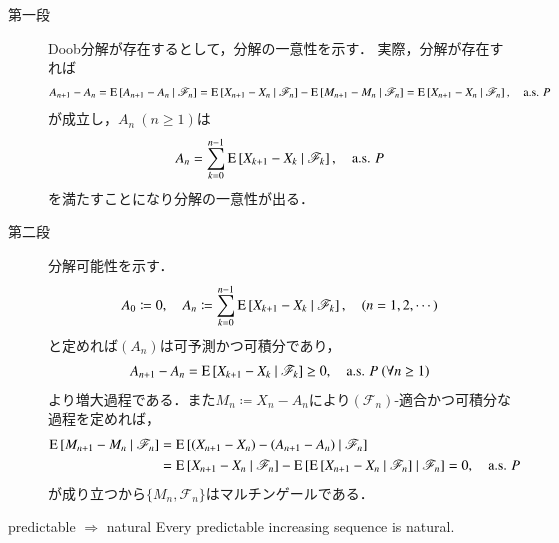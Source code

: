 	\begin{prf}\mbox{}
		\begin{description}
			\item[第一段]
				Doob分解が存在するとして，分解の一意性を示す．
				実際，分解が存在すれば
				\begin{align}
					A_{n+1} - A_n = \operatorname{E} \left[ A_{n+1}-A_n \ \middle|\ \mathscr{F}_{n} \right]
					= \operatorname{E} \left[ X_{n+1}-X_n \ \middle|\ \mathscr{F}_{n} \right] - \operatorname{E} \left[ M_{n+1}-M_n \ \middle|\ \mathscr{F}_{n} \right]
					= \operatorname{E} \left[ X_{n+1}-X_n \ \middle|\ \mathscr{F}_{n} \right],
					\quad \mbox{a.s. $P$}
				\end{align}
				が成立し，$A_n\ (n \geq 1)$は
				\begin{align}
					A_n = \sum_{k=0}^{n-1} \operatorname{E} \left[ X_{k+1}-X_k \ \middle|\ \mathscr{F}_{k} \right],
					\quad \mbox{a.s. $P$}
				\end{align}
				を満たすことになり分解の一意性が出る．
				
			\item[第二段]
				分解可能性を示す．
				\begin{align}
					A_0 \coloneqq 0,
					\quad A_n \coloneqq \sum_{k=0}^{n-1} \operatorname{E} \left[ X_{k+1}-X_k \ \middle|\ \mathscr{F}_{k} \right],
					\quad (n=1,2,\cdots)
				\end{align}
				と定めれば$(A_n)$は可予測かつ可積分であり，
				\begin{align}
					A_{n+1} - A_n = \operatorname{E} \left[ X_{k+1}-X_k \ \middle|\ \mathscr{F}_{k} \right] \geq 0,
					\quad \mbox{a.s. $P$}
					\ (\forall n \geq 1)
				\end{align}
				より増大過程である．また$M_n \coloneqq X_n - A_n$により$(\mathscr{F}_n)$-適合かつ可積分な過程を定めれば，
				\begin{align}
					\operatorname{E} \left[ M_{n+1} - M_n \ \middle|\ \mathscr{F}_n \right]
					&= \operatorname{E} \left[ (X_{n+1} - X_n)-(A_{n+1}-A_n) \ \middle|\ \mathscr{F}_n \right] \\
					&= \operatorname{E} \left[ X_{n+1} - X_n \ \middle|\ \mathscr{F}_n \right] - \operatorname{E} \left[ \operatorname{E} \left[ X_{n+1} - X_n \ \middle|\ \mathscr{F}_n \right] \ \middle|\ \mathscr{F}_n \right]
					= 0,
					\quad \mbox{a.s. $P$}
				\end{align}
				が成り立つから$\{M_n,\mathscr{F}_n\}$はマルチンゲールである．
				\QED
		\end{description}
	\end{prf}
	
	\begin{itembox}[l]{predictable $\Rightarrow$ natural}
		Every predictable increasing sequence is natural.
	\end{itembox}
	
	\begin{prf}
		
	\end{prf}